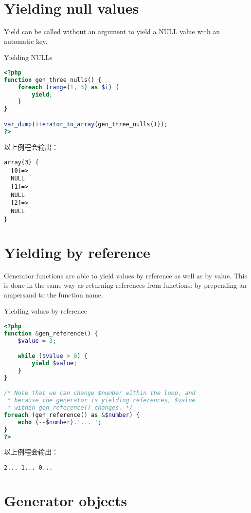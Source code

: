 \section{Yielding null values}

Yield can be called without an argument to yield a NULL value with an automatic key.


\begin{example}
Yielding NULLs
\begin{lstlisting}[language=PHP]
<?php
function gen_three_nulls() {
    foreach (range(1, 3) as $i) {
        yield;
    }
}

var_dump(iterator_to_array(gen_three_nulls()));
?>
\end{lstlisting}
\end{example}

以上例程会输出：

\begin{verbatim}
array(3) {
  [0]=>
  NULL
  [1]=>
  NULL
  [2]=>
  NULL
}
\end{verbatim}


\section{Yielding by reference}

Generator functions are able to yield values by reference as well as by value. This is done in the same way as returning references from functions: by prepending an ampersand to the function name.

\begin{example}
Yielding values by reference
\begin{lstlisting}[language=PHP]
<?php
function &gen_reference() {
    $value = 3;

    while ($value > 0) {
        yield $value;
    }
}

/* Note that we can change $number within the loop, and
 * because the generator is yielding references, $value
 * within gen_reference() changes. */
foreach (gen_reference() as &$number) {
    echo (--$number).'... ';
}
?>
\end{lstlisting}
\end{example}

以上例程会输出：

\begin{verbatim}
2... 1... 0... 
\end{verbatim}


\section{Generator objects}


